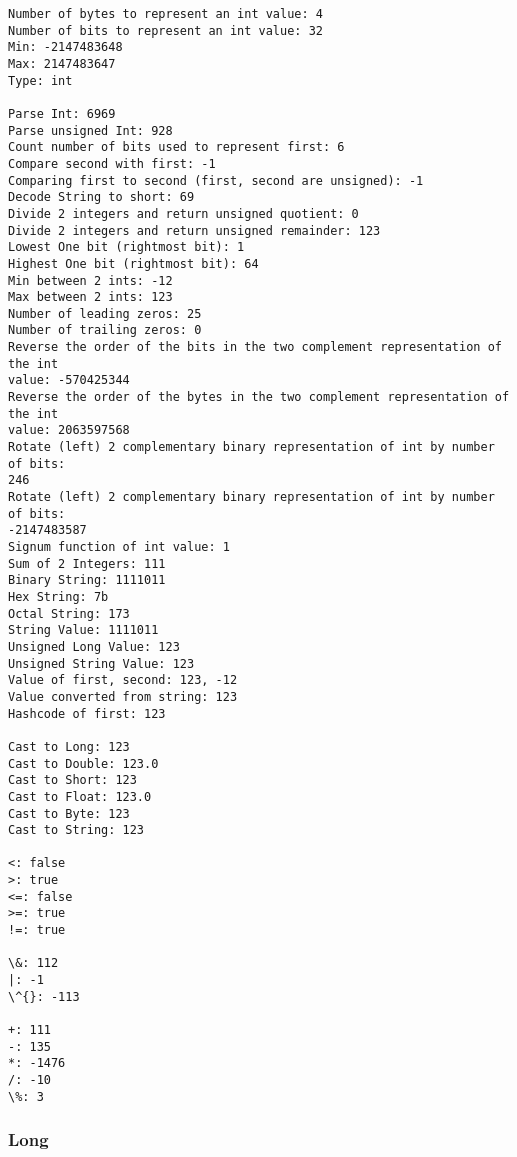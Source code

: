 \documentclass[11pt]{article}
\begin{document}
    \begin{Verbatim}[commandchars=\\\{\}]
Number of bytes to represent an int value: 4
Number of bits to represent an int value: 32
Min: -2147483648
Max: 2147483647
Type: int

Parse Int: 6969
Parse unsigned Int: 928
Count number of bits used to represent first: 6
Compare second with first: -1
Comparing first to second (first, second are unsigned): -1
Decode String to short: 69
Divide 2 integers and return unsigned quotient: 0
Divide 2 integers and return unsigned remainder: 123
Lowest One bit (rightmost bit): 1
Highest One bit (rightmost bit): 64
Min between 2 ints: -12
Max between 2 ints: 123
Number of leading zeros: 25
Number of trailing zeros: 0
Reverse the order of the bits in the two complement representation of the int
value: -570425344
Reverse the order of the bytes in the two complement representation of the int
value: 2063597568
Rotate (left) 2 complementary binary representation of int by number of bits:
246
Rotate (left) 2 complementary binary representation of int by number of bits:
-2147483587
Signum function of int value: 1
Sum of 2 Integers: 111
Binary String: 1111011
Hex String: 7b
Octal String: 173
String Value: 1111011
Unsigned Long Value: 123
Unsigned String Value: 123
Value of first, second: 123, -12
Value converted from string: 123
Hashcode of first: 123

Cast to Long: 123
Cast to Double: 123.0
Cast to Short: 123
Cast to Float: 123.0
Cast to Byte: 123
Cast to String: 123

<: false
>: true
<=: false
>=: true
!=: true

\&: 112
|: -1
\^{}: -113

+: 111
-: 135
*: -1476
/: -10
\%: 3
    \end{Verbatim}

    \hypertarget{long}{%
\subsubsection{Long}\label{long}}
\end{document}
